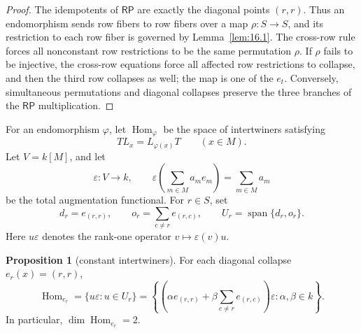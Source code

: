 \documentclass[11pt]{article}
\theoremstyle{definition}
\newtheorem{proposition}[theorem]{Proposition}
\newcommand{\RP}{\mathsf{RP}}
\begin{document}
\begin{proof}
The idempotents of \(\RP\) are exactly the diagonal points \((r,r)\).
Thus an endomorphism sends row fibers to row fibers over a map
\(\rho:S\to S\), and its restriction to each row fiber is governed by
Lemma~\ref{lem:16.1}.  The cross-row rule forces all nonconstant row
restrictions to be the same permutation \(\rho\).  If \(\rho\) fails to be
injective, the cross-row equations force all affected row restrictions to
collapse, and then the third row collapses as well; the map is one of the
\(e_t\).  Conversely, simultaneous permutations and diagonal collapses
preserve the three branches of the \(\RP\) multiplication.
\end{proof}

For an endomorphism \(\varphi\), let \(\operatorname{Hom}_\varphi\) be the
space of intertwiners satisfying
\[
T L_x=L_{\varphi(x)}T
\qquad(x\in M).
\]
Let \(V=k[M]\), and let
\[
\varepsilon:V\to k,
\qquad
\varepsilon\!\left(\sum_{m\in M}a_m e_m\right)=\sum_{m\in M}a_m
\]
be the total augmentation functional.  For \(r\in S\), set
\[
d_r=e_{(r,r)},
\qquad
 o_r=\sum_{c\ne r}e_{(r,c)},
\qquad
U_r=\operatorname{span}\{d_r,o_r\}.
\]
Here \(u\varepsilon\) denotes the rank-one operator
\(v\mapsto \varepsilon(v)u\).

\begin{proposition}[constant intertwiners]
\label{prop:constant-intertwiners}
For each diagonal collapse \(e_r(x)=(r,r)\),
\[
\operatorname{Hom}_{e_r}
=
\{u\varepsilon:u\in U_r\}
=
\left\{
\left(\alpha e_{(r,r)}+\beta\sum_{c\ne r}e_{(r,c)}\right)\varepsilon:
\alpha,\beta\in k
\right\}.
\]
In particular, \(\dim\operatorname{Hom}_{e_r}=2\).
\end{proposition}
\end{document}
